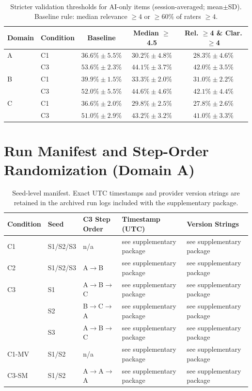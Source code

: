 \documentclass[acmsmall]{acmart}
\begin{document}
\begin{table}[h!]
  \centering
  \caption{Stricter validation thresholds for AI-only items (session-averaged; mean$\pm$SD). Baseline rule: median relevance $\ge 4$ or $\ge 60\%$ of raters $\ge 4$.}
  \label{tab:val-threshold}
  \small
  \begin{tabular}{@{}l l c c c@{}}
    \toprule
    \textbf{Domain} & \textbf{Condition} & \textbf{Baseline} & \textbf{Median $\ge$ 4.5} & \textbf{Rel. $\ge$4 \& Clar. $\ge$4} \\
    \midrule
    A & C1 & $36.6\%\pm5.5\%$ & $30.2\%\pm4.8\%$ & $28.3\%\pm4.6\%$ \\
      & C3 & $53.6\%\pm2.3\%$ & $44.1\%\pm3.7\%$ & $42.0\%\pm3.5\%$ \\
    \midrule
    B & C1 & $39.9\%\pm1.5\%$ & $33.3\%\pm2.0\%$ & $31.0\%\pm2.2\%$ \\
      & C3 & $52.0\%\pm5.5\%$ & $44.6\%\pm4.6\%$ & $42.1\%\pm4.4\%$ \\
    \midrule
    C & C1 & $36.6\%\pm2.0\%$ & $29.8\%\pm2.5\%$ & $27.8\%\pm2.6\%$ \\
      & C3 & $51.0\%\pm2.9\%$ & $43.2\%\pm3.2\%$ & $41.0\%\pm3.3\%$ \\
    \bottomrule
  \end{tabular}
\end{table}

\section{Run Manifest and Step-Order Randomization (Domain A)}

\begin{table}[t]
  \centering
  \caption{Seed-level manifest. Exact UTC timestamps and provider version strings are retained in the archived run logs included with the supplementary package.}
  \label{tab:manifest}
  \small
  \begin{tabular}{@{}l l l l l@{}}
    \toprule
    \textbf{Condition} & \textbf{Seed} & \textbf{C3 Step Order} & \textbf{Timestamp (UTC)} & \textbf{Version Strings} \\
    \midrule
    C1 & S1/S2/S3 & n/a & see supplementary package & see supplementary package \\
    C2 & S1/S2/S3 & A$\rightarrow$B & see supplementary package & see supplementary package \\
    C3 & S1 & A$\rightarrow$B$\rightarrow$C & see supplementary package & see supplementary package \\
       & S2 & B$\rightarrow$C$\rightarrow$A & see supplementary package & see supplementary package \\
       & S3 & A$\rightarrow$B$\rightarrow$C & see supplementary package & see supplementary package \\
    C1-MV & S1/S2 & n/a & see supplementary package & see supplementary package \\
    C3-SM & S1/S2 & A$\rightarrow$A$\rightarrow$A & see supplementary package & see supplementary package \\
    \bottomrule
  \end{tabular}
\end{table}
\end{document}
